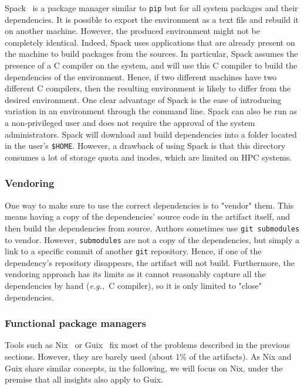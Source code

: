 \documentclass[sigconf,natbib=false]{acmart}
\newcommand{\eg}{\emph{e.g.,}}
\begin{document}
Spack\ \cite{gamblin_spack_2015} is a package manager similar to \texttt{pip} but for all system packages and their dependencies.
It is possible to export the environment as a text file and rebuild it on another machine.
However, the produced environment might not be completely identical.
Indeed, Spack uses applications that are already present on the machine to build packages from the sources.
In particular, Spack assumes the presence of a C compiler on the system, and will use this C compiler to build the dependencies of the environment.
Hence, if two different machines have two different C compilers, then the resulting environment is likely to differ from the desired environment.
One clear advantage of Spack is the ease of introducing variation in an environment through the command line.
Spack can also be run as a non-privileged user and does not require the approval of the system administrators.
Spack will download and build dependencies into a folder located in the user's \texttt{\$HOME}.
However, a drawback of using Spack is that this directory consumes a lot of storage quota and inodes, which are limited on HPC systems.

\subsubsection{Vendoring}

One way to make sure to use the correct dependencies is to "vendor" them.
This means having a copy of the dependencies' source code in the artifact itself, and then build the dependencies from source.
Authors sometimes use \texttt{git submodules} to vendor.
However, \texttt{submodules} are not a copy of the dependencies, but simply a link to a specific commit of another \texttt{git} repository.
Hence, if one of the dependency's repository disappears, the artifact will not build.
Furthermore, the vendoring approach has its limits as it cannot reasonably capture all the dependencies by hand (\eg\ C compiler), so it is only limited to "close" dependencies.

\subsubsection{Functional package managers}

Tools such as Nix\ \cite{dolstra_nix_2004} or Guix\ \cite{courtes_functional_2013} fix most of the problems described in the previous sections.
However, they are barely used (about 1\% of the artifacts).
As Nix and Guix share similar concepts, in the following, we will focus on Nix, under the premise that all insights also apply to Guix.
\end{document}
